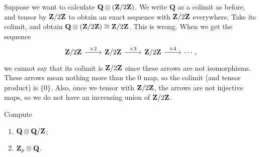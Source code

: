 \documentclass[11pt, oneside,margin=1in]{article}
\begin{document}
\begin{example}[Mistake]\label{}
Suppose we want to calculate $\mathbf{Q}\otimes (\mathbf Z / 2\mathbf Z)$. We write $\mathbf{Q}$ as a colimit as before, and tensor by $\mathbf Z / 2\mathbf Z$ to obtain an exact sequence with $\mathbf Z / 2\mathbf Z$ everywhere. Take its colimit, and obtain $\mathbf{Q}\otimes (\mathbf Z / 2\mathbf Z) \cong \mathbf Z / 2\mathbf Z$. This is wrong. When we get the sequence
\[
\begin{tikzcd}
\Zmod 2 \arrow[r, "\times 2"] & \Zmod 2 \arrow[r, "\times 3"] & \Zmod 2 \arrow[r, "\times 4"] & \cdots,
\end{tikzcd}
\]
we cannot say that its colimit is $\mathbf Z / 2\mathbf Z$ since these arrows are not isomorphisms. These arrows mean nothing more than the $0$ map, so the colimit (and tensor product) is $\{0\}$. Also, once we tensor with $\mathbf Z / 2\mathbf Z$, the arrows are not injective maps, so we do not have an increasing union of $\mathbf Z / 2\mathbf Z$.
\end{example}
\begin{exercise}\label{}
	Compute
\begin{enumerate}
	\item $\mathbf Q \otimes \mathbf Q/\mathbf Z$;
	\item $\mathbf Z_p\otimes \mathbf Q$.
\end{enumerate}
\end{exercise}
\end{document}
